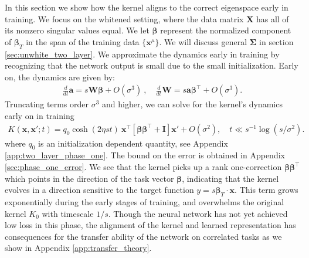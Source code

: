 \documentclass{article} %
\def\x{\bm x}
\begin{document}
In this section we show how the kernel aligns to the correct eigenspace early in training. 
We focus on the whitened setting, where the data matrix $\bm X$ has all of its nonzero singular values equal. We let $\bm\beta$ represent the normalized component of $\bm\beta_T$ in the span of the training data $\{ \x^\mu \}$. We will discuss general $\bm\Sigma$ in section \ref{sec:unwhite_two_layer}.  We approximate the dynamics early in training by recognizing that the network output is small due to the small initialization.  Early on, the dynamics are given by:
\begin{align}
    \frac{d}{dt} \bm  a = s \bm W \bm\beta + O(\sigma^3)  \ , \quad
    \frac{d}{dt} \bm  W =  s \bm a \bm \beta^\top + O(\sigma^3).
\end{align}
Truncating terms order $\sigma^3$ and higher, we can solve for the kernel's dynamics early on in training
\begin{align}\label{eq:approx_align}
    K(\x,\x';t) = q_0 \cosh(2\eta st) \ \x^\top \left[ \bm\beta \bm\beta^\top +  \bm I \right] \x' +  O(\sigma^2), \quad t \ll s^{-1} \log(s/\sigma^2).
\end{align}
where $q_0$ is an initialization dependent quantity, see Appendix \ref{app:two_layer_phase_one}. The bound on the error is obtained in Appendix \ref{sec:phase_one_error}. We see that the kernel picks up a rank one-correction $\bm\beta \bm\beta^\top$ which points in the direction of the task vector $\bm \beta$, indicating that the kernel evolves in a direction sensitive to the target function $y = s \bm\beta_T \cdot \bm x$. This term grows exponentially during the early stages of training, and overwhelms the original kernel $K_0$ with timescale $1/s$. Though the neural network has not yet achieved low loss in this phase, the alignment of the kernel and learned representation has consequences for the transfer ability of the network on correlated tasks as we show in Appendix \ref{app:transfer_theory}.



\end{document}
